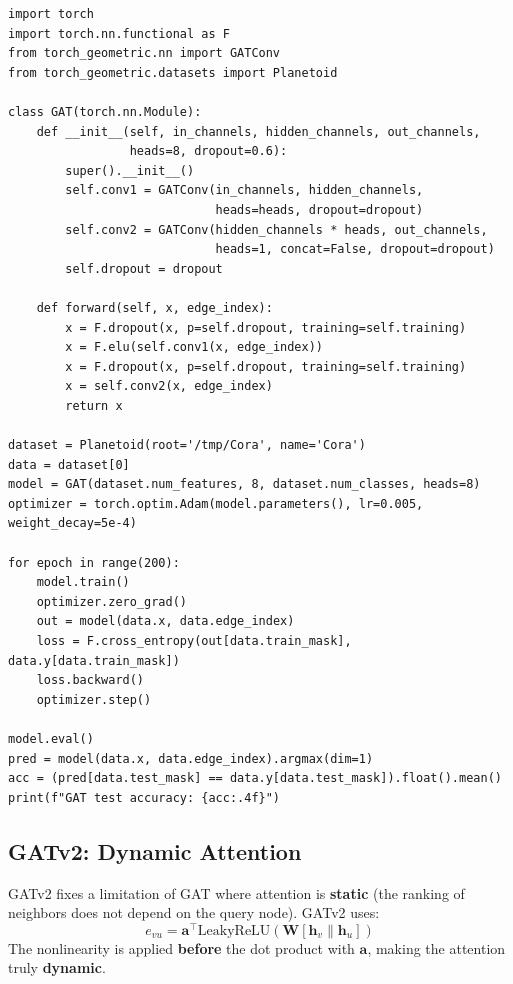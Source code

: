 \begin{codeblock}[title=\textbf{GAT implementation with PyTorch Geometric}]
\begin{verbatim}
import torch
import torch.nn.functional as F
from torch_geometric.nn import GATConv
from torch_geometric.datasets import Planetoid

class GAT(torch.nn.Module):
    def __init__(self, in_channels, hidden_channels, out_channels,
                 heads=8, dropout=0.6):
        super().__init__()
        self.conv1 = GATConv(in_channels, hidden_channels,
                             heads=heads, dropout=dropout)
        self.conv2 = GATConv(hidden_channels * heads, out_channels,
                             heads=1, concat=False, dropout=dropout)
        self.dropout = dropout

    def forward(self, x, edge_index):
        x = F.dropout(x, p=self.dropout, training=self.training)
        x = F.elu(self.conv1(x, edge_index))
        x = F.dropout(x, p=self.dropout, training=self.training)
        x = self.conv2(x, edge_index)
        return x

dataset = Planetoid(root='/tmp/Cora', name='Cora')
data = dataset[0]
model = GAT(dataset.num_features, 8, dataset.num_classes, heads=8)
optimizer = torch.optim.Adam(model.parameters(), lr=0.005, weight_decay=5e-4)

for epoch in range(200):
    model.train()
    optimizer.zero_grad()
    out = model(data.x, data.edge_index)
    loss = F.cross_entropy(out[data.train_mask], data.y[data.train_mask])
    loss.backward()
    optimizer.step()

model.eval()
pred = model(data.x, data.edge_index).argmax(dim=1)
acc = (pred[data.test_mask] == data.y[data.test_mask]).float().mean()
print(f"GAT test accuracy: {acc:.4f}")
\end{verbatim}
\end{codeblock}

\subsection{GATv2: Dynamic Attention}

\begin{definition}
GATv2 fixes a limitation of GAT where attention is \textbf{static} (the
ranking of neighbors does not depend on the query node). GATv2 uses:
\[
    e_{vu} = \mathbf{a}^\top \text{LeakyReLU}\!\left(\mathbf{W}\!\left[
    \mathbf{h}_v \| \mathbf{h}_u\right]\right)
\]
The nonlinearity is applied \textbf{before} the dot product with $\mathbf{a}$,
making the attention truly \textbf{dynamic}.
\end{definition}

